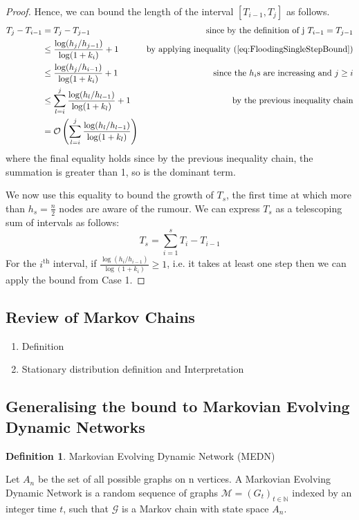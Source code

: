 \documentclass[a4paper,11pt]{article}
\theoremstyle{definition}
\newtheorem{definition}[theorem]{Definition}
\begin{document}
\begin{proof}
	Hence, we can bound the length of the interval $[T_{i-1}, T_j]$ as follows.
	\begin{align*}
		T_j - T_{i-1} &= T_j - T_{j-1} & \text{since by the definition of j } T_{i-1} = T_{j-1}\\
		& \leq \frac{\log (h_j/h_{j-1})}{\log(1+k_i)} + 1 & \text{by applying inequality }(\ref{eq:FloodingSingleStepBound}) \\
		& \leq \frac{\log (h_j/h_{i-1})}{\log(1+k_i)} + 1 & \text{since the } h_i \text{s are increasing and } j \geq i \\
		& \leq \sum_{l=i}^j \frac{\log (h_{l}/h_{l-1})}{\log(1+k_l) } + 1 & \text{ by the previous inequality chain} \\
		& = \mathcal{O}\left(\sum_{l=i}^j \frac{\log (h_{l}/h_{l-1})}{\log(1+k_l) }\right)
 	\end{align*}
	where the final equality holds since by the previous inequality chain, the summation is greater than 1, so is the dominant term.

	We now use this equality to bound the growth of $T_s$, the first time at which more than $h_s = \frac{n}{2}$ nodes are aware of the rumour. We can express $T_s$ as a telescoping sum of intervals as follows:
	$$
		T_s = \sum_{i=1}^s T_i - T_{i-1}
	$$
	For the $i^\text{th}$ interval, if $\frac{\log (h_i/h_{i-1})}{\log(1+k_i)} \geq 1$, i.e. it takes at least one step then we can apply the bound from Case 1.
	
\end{proof}

\subsection{Review of Markov Chains}

\begin{enumerate}
	\item Definition
	\item Stationary distribution definition and Interpretation
\end{enumerate}

\subsection{Generalising the bound to Markovian Evolving Dynamic Networks}
\label{subsection:MEDNBound}

\begin{definition}
	Markovian Evolving Dynamic Network (MEDN)

	\noindent 
	Let $A_n$ be the set of all possible graphs on n vertices.
	A Markovian Evolving Dynamic Network is a random sequence of graphs $\mathcal{M} = (G_t)_{t \in \mathbb{N}}$ indexed by an integer time $t$, such that $\mathcal{G}$ is a Markov chain with state space $A_n$.
\end{definition}
\end{document}
